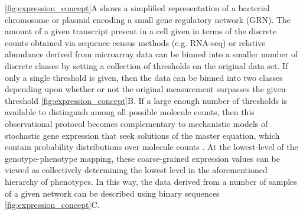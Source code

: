 \ref{fig:expression_concept}A shows a simplified representation of a bacterial chromosome or plasmid encoding a small gene regulatory network (GRN). The amount of a given transcript present in a cell given in terms of the discrete counts obtained via sequence census methods (e.g. RNA-seq) or relative abundance derived from microarray data can be binned into a smaller number of discrete classes by setting a collection of thresholds on the original data set. If only a single threshold is given, then the data can be binned into two classes depending upon whether or not the original measurement surpasses the given threshold \ref{fig:expression_concept}B. If a large enough number of thresholds is available to distinguish among all possible molecule counts, then this observational protocol becomes complementary to mechanistic models of stochastic gene expression that seek solutions of the master equation, which contain probability distributions over molecule counts \cite{Walczak2009,Mugler2009}. At the lowest-level of the genotype-phenotype mapping, these coarse-grained expression values can be viewed as collectively determining the lowest level in the aforementioned hierarchy of phenotypes. In this way, the data derived from a number of samples of a given network can be described using binary sequences \ref{fig:expression_concept}C.

